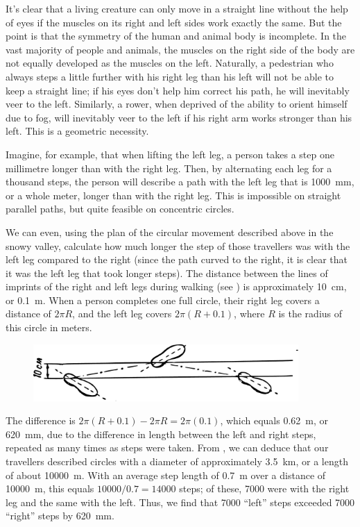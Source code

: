 It's clear that a living creature can only move in a straight line without the help of eyes if the muscles on its right and left sides work exactly the same. But the point is that the symmetry of the human and animal body is incomplete. In the vast majority of people and animals, the muscles on the right side of the body are not equally developed as the muscles on the left. Naturally, a pedestrian who always steps a little further with his right leg than his left will not be able to keep a straight line; if his eyes don't help him correct his path, he will inevitably veer to the left. Similarly, a rower, when deprived of the ability to orient himself due to fog, will inevitably veer to the left if his right arm works stronger than his left. This is a geometric necessity.

Imagine, for example, that when lifting the left leg, a person takes a step one millimetre longer than with the right leg. Then, by alternating each leg for a thousand steps, the person will describe a path with the left leg that is \SI{1000}{\milli\meter}, or a whole meter, longer than with the right leg. This is impossible on straight parallel paths, but quite feasible on concentric circles.

We can even, using the plan of the circular movement described above in the snowy valley, calculate how much longer the step of those travellers was with the left leg compared to the right (since the path curved to the right, it is clear that it was the left leg that took longer steps). The distance between the lines of imprints of the right and left legs during walking (see ) is approximately \SI{10}{\centi\meter}, or \SI{0.1}{\meter}. When a person completes one full circle, their right leg covers a distance of $2\pi R$, and the left leg covers $2\pi(R + 0.1)$, where $R$ is the radius of this circle in meters. 

\begin{figure}[h!]
\centering
\includegraphics[width=0.9\textwidth]{figures/ch-08/fig-115.pdf}
\end{figure}


The difference is $2\pi(R + 0.1) - 2 \pi R  = 2 \pi(0.1)$, which equals \SI{0.62}{\meter}, or \SI{620}{\milli\meter}, due to the difference in length between the left and right steps, repeated as many times as steps were taken. From , we can deduce that our travellers described circles with a diameter of approximately \SI{3.5}{\kilo\meter}, or a length of about \SI{10000}{\meter}. With an average step length of \SI{0.7}{\meter} over a distance of \SI{10000}{\meter}, this equals $10000/0.7 = 14000$ steps; of these, 7000 were with the right leg and the same with the left. Thus, we find that 7000 ``left'' steps exceeded 7000 ``right'' steps by \SI{620}{\milli\meter}.


